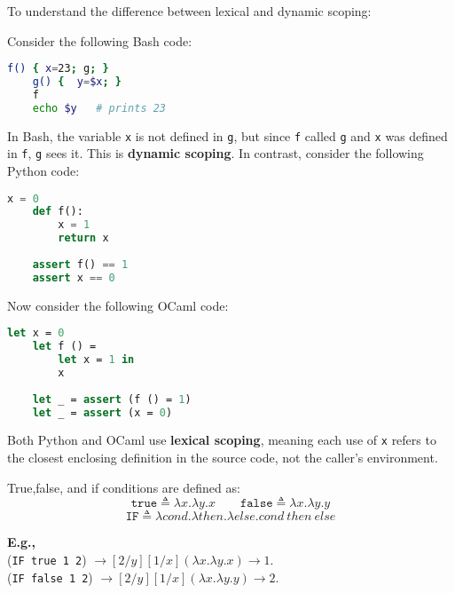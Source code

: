 \newpage 

\noindent
To understand the difference between lexical and dynamic scoping:

\begin{Example}

    \noindent
    Consider the following Bash code:
    
    \begin{lstlisting}[language=bash,numbers=none]
    f() { x=23; g; } 
    g() {  y=$x; }
    f
    echo $y   # prints 23
    \end{lstlisting}
    
    \noindent
    In Bash, the variable \texttt{x} is not defined in \texttt{g}, but since \texttt{f} called \texttt{g} and \texttt{x} was defined in \texttt{f}, \texttt{g} sees it. This is \textbf{dynamic scoping}.
    In contrast, consider the following Python code:

    \begin{lstlisting}[language=python,numbers=none]
    x = 0
    def f():
        x = 1
        return x
    
    assert f() == 1
    assert x == 0
    \end{lstlisting}
    
    \noindent
    Now consider the following OCaml code:
    \begin{lstlisting}[language=ML,numbers=none]
    let x = 0
    let f () = 
        let x = 1 in
        x
    
    let _ = assert (f () = 1)
    let _ = assert (x = 0)
    \end{lstlisting}
    
    \noindent
    Both Python and OCaml use \textbf{lexical scoping}, meaning each use of \texttt{x} refers to the closest enclosing definition in the source code, not the caller's environment.
\end{Example}

\begin{theo}

    True,false, and if conditions are defined as:
    \Large
    \[
    \texttt{true} \triangleq \lambda x. \lambda y. x
    \quad\quad
    \texttt{false} \triangleq \lambda x. \lambda y. y
    \]
    \LARGE
    \[
    \texttt{IF} \triangleq \lambda cond. \lambda then. \lambda else. cond\ then\ else
    \]

    \normalsize
    \noindent
    \textbf{E.g.,}\\ 
    (\texttt{IF true 1 2}) $\to [2/y][1/x](\lambda x.\lambda y.x) \to 1$.\\
     (\texttt{IF false 1 2}) $\to [2/y][1/x](\lambda x.\lambda y.y) \to 2$.
\end{theo}